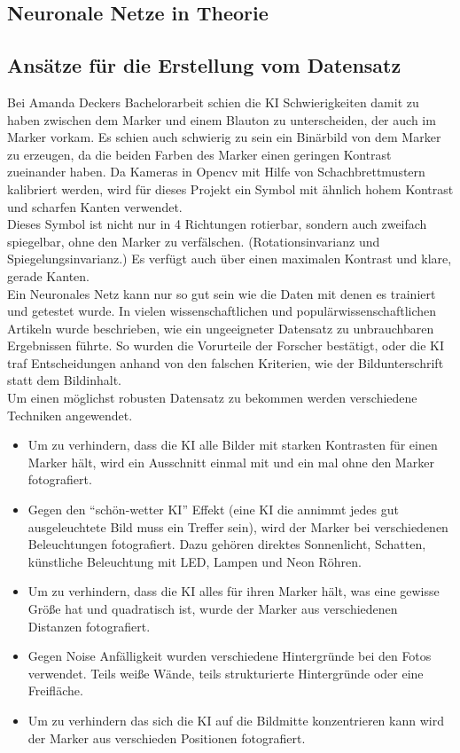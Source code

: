\documentclass[conference]{IEEEtran}
\begin{document}
\subsection{Neuronale Netze in Theorie}	%

\subsection{Ansätze für die Erstellung vom Datensatz}	%

Bei Amanda Deckers Bachelorarbeit schien die KI Schwierigkeiten damit zu haben zwischen dem Marker und einem Blauton zu unterscheiden, der auch im Marker vorkam. Es schien auch schwierig zu sein ein Binärbild von dem Marker zu erzeugen, da die beiden Farben des Marker einen geringen Kontrast zueinander haben. Da Kameras in Opencv mit Hilfe von Schachbrettmustern  kalibriert werden, wird für dieses Projekt ein Symbol mit ähnlich hohem Kontrast und scharfen Kanten verwendet.\\
 Dieses Symbol ist nicht nur in 4 Richtungen rotierbar, sondern auch zweifach spiegelbar, ohne den Marker zu verfälschen. (Rotationsinvarianz und Spiegelungsinvarianz.) Es verfügt auch über einen maximalen Kontrast und klare, gerade Kanten. \\
 \noindent
Ein Neuronales Netz kann nur so gut sein wie die Daten mit denen es trainiert und getestet wurde. In vielen wissenschaftlichen und populärwissenschaftlichen Artikeln wurde beschrieben, wie ein ungeeigneter Datensatz zu unbrauchbaren Ergebnissen führte. So wurden die Vorurteile der Forscher bestätigt, oder die KI traf Entscheidungen anhand von den falschen Kriterien, wie der Bildunterschrift statt dem Bildinhalt. \\
Um einen möglichst robusten Datensatz zu bekommen  werden verschiedene Techniken angewendet.
\begin{itemize}
	\item Um zu verhindern, dass die KI alle Bilder mit starken Kontrasten für einen Marker hält, wird ein Ausschnitt einmal mit und ein mal ohne den Marker fotografiert.
	\item Gegen den "`schön-wetter KI"' Effekt (eine KI die annimmt jedes gut ausgeleuchtete Bild muss ein Treffer sein), wird der Marker bei verschiedenen Beleuchtungen fotografiert. Dazu gehören direktes Sonnenlicht, Schatten, künstliche Beleuchtung mit LED, Lampen und Neon Röhren. 
	\item Um zu verhindern, dass die KI alles für ihren Marker hält, was eine gewisse Größe hat und quadratisch ist, wurde der Marker aus verschiedenen Distanzen fotografiert. 
	\item Gegen Noise Anfälligkeit wurden verschiedene Hintergründe bei den Fotos verwendet. Teils weiße Wände, teils strukturierte Hintergründe oder eine Freifläche. 
	\item Um zu verhindern das sich die KI auf die Bildmitte konzentrieren kann wird der Marker aus verschieden Positionen fotografiert. 
\end{itemize}
\end{document}
